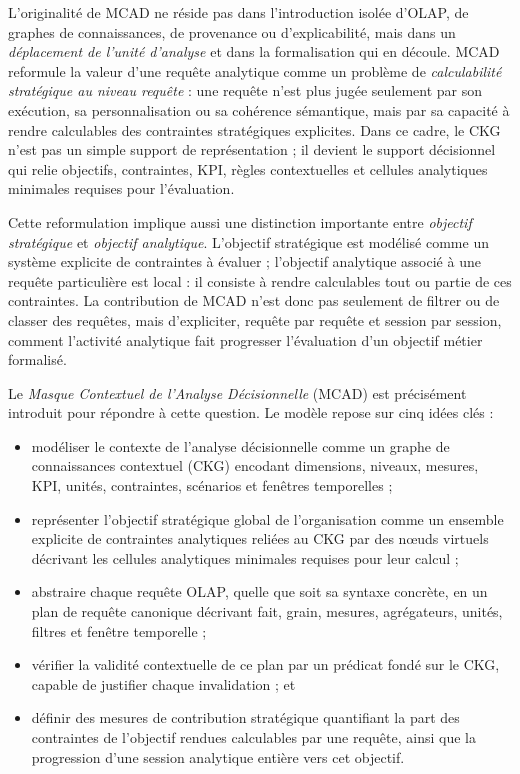 \documentclass[journal]{IEEEtran}
\begin{document}
L'originalité de MCAD ne réside pas dans l'introduction isolée d'OLAP, de graphes de connaissances, de provenance ou d'explicabilité, mais dans un \emph{déplacement de l'unité d'analyse} et dans la formalisation qui en découle. MCAD reformule la valeur d'une requête analytique comme un problème de \emph{calculabilité stratégique au niveau requête} : une requête n'est plus jugée seulement par son exécution, sa personnalisation ou sa cohérence sémantique, mais par sa capacité à rendre calculables des contraintes stratégiques explicites. Dans ce cadre, le CKG n'est pas un simple support de représentation ; il devient le support décisionnel qui relie objectifs, contraintes, KPI, règles contextuelles et cellules analytiques minimales requises pour l'évaluation.

Cette reformulation implique aussi une distinction importante entre \emph{objectif stratégique} et \emph{objectif analytique}. L'objectif stratégique est modélisé comme un système explicite de contraintes à évaluer ; l'objectif analytique associé à une requête particulière est local : il consiste à rendre calculables tout ou partie de ces contraintes. La contribution de MCAD n'est donc pas seulement de filtrer ou de classer des requêtes, mais d'expliciter, requête par requête et session par session, comment l'activité analytique fait progresser l'évaluation d'un objectif métier formalisé.


Le \emph{Masque Contextuel de l'Analyse Décisionnelle} (MCAD) est précisément introduit pour répondre à cette question. Le modèle repose sur cinq idées clés :
\begin{itemize}
  \item modéliser le contexte de l'analyse décisionnelle comme un graphe de connaissances contextuel (CKG) encodant dimensions, niveaux, mesures, KPI, unités, contraintes, scénarios et fenêtres temporelles ;
  \item représenter l'objectif stratégique global de l'organisation comme un ensemble explicite de contraintes analytiques reliées au CKG par des nœuds virtuels décrivant les cellules analytiques minimales requises pour leur calcul ;
  \item abstraire chaque requête OLAP, quelle que soit sa syntaxe concrète, en un plan de requête canonique décrivant fait, grain, mesures, agrégateurs, unités, filtres et fenêtre temporelle ;
  \item vérifier la validité contextuelle de ce plan par un prédicat fondé sur le CKG, capable de justifier chaque invalidation ; et
  \item définir des mesures de contribution stratégique quantifiant la part des contraintes de l'objectif rendues calculables par une requête, ainsi que la progression d'une session analytique entière vers cet objectif.
\end{itemize}
\end{document}
